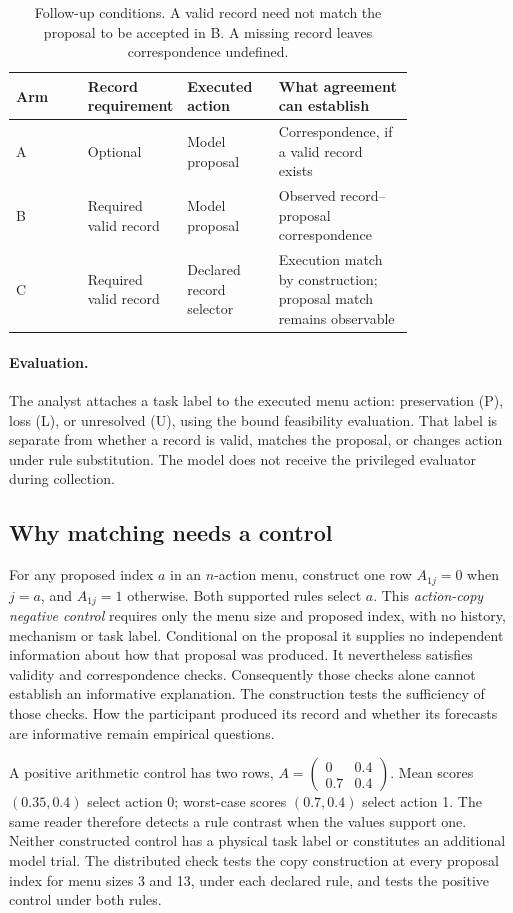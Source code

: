 \begin{table}[htbp]
\centering\small
\begin{tabular}{lp{0.22\linewidth}p{0.23\linewidth}p{0.34\linewidth}}\toprule
Arm & Record requirement & Executed action & What agreement can establish\\\midrule
A & Optional & Model proposal & Correspondence, if a valid record exists\\
B & Required valid record & Model proposal & Observed record--proposal correspondence\\
C & Required valid record & Declared record selector & Execution match by construction; proposal match remains observable\\\bottomrule
\end{tabular}
\caption{Follow-up conditions. A valid record need not match the proposal to
be accepted in B. A missing record leaves correspondence undefined.}
\label{tab:arms-early}
\end{table}

\paragraph{Evaluation.}
The analyst attaches a task label to the executed menu action: preservation
(P), loss (L), or unresolved (U), using the bound feasibility evaluation.
That label is separate from whether a record is valid, matches the proposal,
or changes action under rule substitution. The model does not receive the
privileged evaluator during collection.

\subsection{Why matching needs a control}
For any proposed index $a$ in an $n$-action menu, construct one row
$A_{1j}=0$ when $j=a$, and $A_{1j}=1$ otherwise. Both supported rules select
$a$. This \emph{action-copy negative control} requires only the menu size
and proposed index, with no history, mechanism or task label. Conditional on
the proposal it supplies no independent information about how that proposal
was produced. It nevertheless satisfies validity and correspondence checks.
Consequently those checks alone cannot establish an informative explanation.
The construction tests the sufficiency of those checks. How the participant
produced its record and whether its forecasts are informative remain empirical
questions.

A positive arithmetic control has two rows,
$A=\left(\begin{smallmatrix}0&0.4\\0.7&0.4\end{smallmatrix}\right)$.
Mean scores $(0.35,0.4)$ select action 0; worst-case scores $(0.7,0.4)$
select action 1. The same reader therefore detects a rule contrast when the
values support one. Neither constructed control has a physical task label
or constitutes an additional model trial. The distributed check tests the
copy construction at every proposal index for menu sizes 3 and 13, under
each declared rule, and tests the positive control under both rules.

